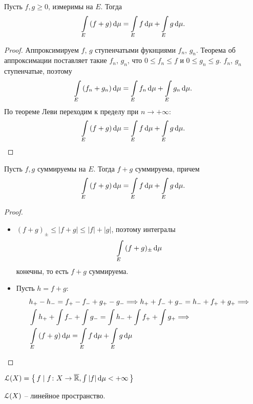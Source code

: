 \begin{theorem}

    Пусть $f, g \geqslant 0$, измеримы на $E$. Тогда
    \[
        \int\limits_E{(f + g) \,\mathrm{d}\mu} = \int\limits_E{f \,\mathrm{d}\mu} + \int\limits_E{g \,\mathrm{d}\mu}
    .\] 
\end{theorem}
\begin{proof}
    Аппроксимируем $f$, $g$ ступенчатыми фукнциями $f_n$, $g_n$.
    Теорема об аппроксимации поставляет такие $f_n$, $g_n$, что $0 \leqslant f_n \leqslant f$ и 
    $0 \leqslant g_n \leqslant g$. $f_n$, $g_n$ ступенчатые, поэтому
    \[
        \int\limits_{E}{(f_n + g_n) \,\mathrm{d}\mu} = \int\limits_{E}{f_n \,\mathrm{d}\mu} + \int\limits_{E}{g_n \,\mathrm{d}\mu}
    .\]
    По теореме Леви переходим к пределу при $n \to +\infty$:
    \[
        \int\limits_{E}{(f + g) \,\mathrm{d}\mu} = \int\limits_{E}{f \,\mathrm{d}\mu} + \int\limits_{E}{g \,\mathrm{d}\mu}
    .\]
\end{proof}

\begin{corollary}

    Пусть $f, g$ суммируемы на $E$. Тогда $f + g$ суммируема, причем
    \[
        \int\limits_E{(f + g) \,\mathrm{d}\mu} = \int\limits_E{f \,\mathrm{d}\mu} + \int\limits_E{g \,\mathrm{d}\mu}
    .\]
\end{corollary}
\begin{proof}
    \enewline
    \begin{itemize}
        \item $(f+g)_{\pm} \leqslant |f + g| \leqslant |f| + |g|$, поэтому интегралы
            \[
                \int\limits_{E}{(f + g)_{\pm} \,\mathrm{d}\mu}
            \] 
            конечны, то есть $f + g$ суммируема.
        \item Пусть $h = f + g$:
            \begin{align*}
            &h_+ - h_- = f_+ - f_- + g_+ - g_- \Longrightarrow h_+ + f_- + g_- = h_- + f_+ + g_+ \Longrightarrow \\
            &\int{h_+} + \int{f_-} + \int{g_-} = \int{h_-} + \int{f_+} + \int{g_+} \Longrightarrow \\
            &\int\limits_{E}{(f + g) \,\mathrm{d}\mu} = \int\limits_{E}{f \,\mathrm{d}\mu} + \int\limits_{E}{g \,\mathrm{d}\mu}
            \end{align*}
    \end{itemize}
\end{proof}

\begin{definition}
    $\mathcal{L}(X) = \left\{\, f \mid f \colon X \to \overline{\mathbb{R}}, \int{|f| \,\mathrm{d}\mu} < +\infty \,\right\}$
\end{definition}

\begin{lemma}
    $\mathcal{L}(X)$ -- линейное пространство. 
\end{lemma}

